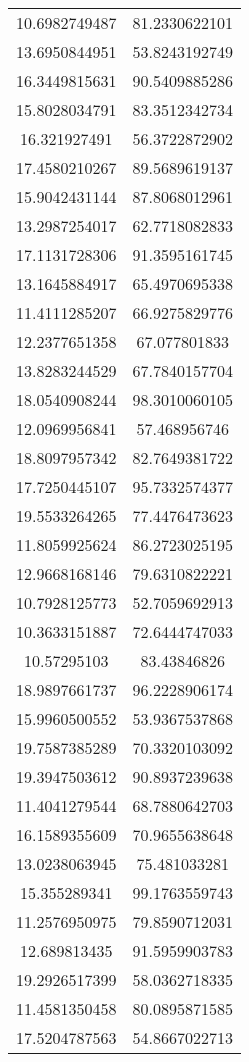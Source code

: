 \begin{table}
\begin{tabular}{cc}
10.6982749487 & 81.2330622101 \\
13.6950844951 & 53.8243192749 \\
16.3449815631 & 90.5409885286 \\
15.8028034791 & 83.3512342734 \\
16.321927491 & 56.3722872902 \\
17.4580210267 & 89.5689619137 \\
15.9042431144 & 87.8068012961 \\
13.2987254017 & 62.7718082833 \\
17.1131728306 & 91.3595161745 \\
13.1645884917 & 65.4970695338 \\
11.4111285207 & 66.9275829776 \\
12.2377651358 & 67.077801833 \\
13.8283244529 & 67.7840157704 \\
18.0540908244 & 98.3010060105 \\
12.0969956841 & 57.468956746 \\
18.8097957342 & 82.7649381722 \\
17.7250445107 & 95.7332574377 \\
19.5533264265 & 77.4476473623 \\
11.8059925624 & 86.2723025195 \\
12.9668168146 & 79.6310822221 \\
10.7928125773 & 52.7059692913 \\
10.3633151887 & 72.6444747033 \\
10.57295103 & 83.43846826 \\
18.9897661737 & 96.2228906174 \\
15.9960500552 & 53.9367537868 \\
19.7587385289 & 70.3320103092 \\
19.3947503612 & 90.8937239638 \\
11.4041279544 & 68.7880642703 \\
16.1589355609 & 70.9655638648 \\
13.0238063945 & 75.481033281 \\
15.355289341 & 99.1763559743 \\
11.2576950975 & 79.8590712031 \\
12.689813435 & 91.5959903783 \\
19.2926517399 & 58.0362718335 \\
11.4581350458 & 80.0895871585 \\
17.5204787563 & 54.8667022713 \\

\end{tabular}
\end{table}

